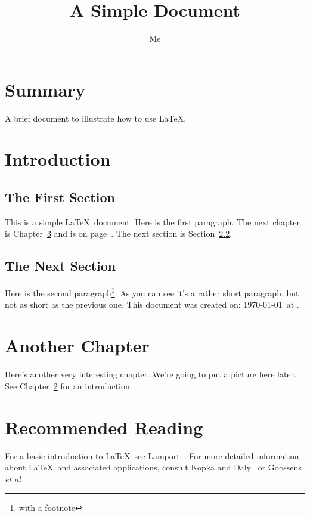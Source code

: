 \documentclass[12pt]{scrbook}
\title{A Simple Document}
\author{Me}
\begin{document}
\maketitle

\frontmatter
\tableofcontents

\chapter{Summary}
A brief document to
illustrate how to use \LaTeX.

\mainmatter
\chapter{Introduction}
\label{ch:intro}

\section{The First Section}

This is a simple \LaTeX\ document.
Here is the first paragraph.
The next chapter is Chapter~\ref{ch:another}
and is on page~\pageref{ch:another}.
The next section is Section~\ref{sec:next}.

\section{The Next Section}
\label{sec:next}

Here is the second paragraph\footnote{with a footnote}. 
As you can see it's a rather short paragraph, but not 
as short as the previous one. This document was 
created on: \today\ at \currenttime.

\chapter{Another Chapter}
\label{ch:another}

Here's another very interesting chapter.
We're going to put a picture here later.
See Chapter~\ref{ch:intro} for an 
introduction.

\chapter{Recommended Reading}

For a basic introduction to \LaTeX\ see Lamport~\cite{lamport94}.
For more detailed information about \LaTeX\ and
associated applications, consult Kopka and Daly~\cite{kopka95}
or Goossens \emph{et al}~\cite{goossens94}.
\end{document}
